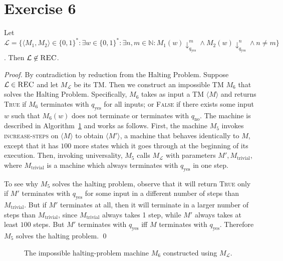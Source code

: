 \documentclass[11pt]{llncs}
\begin{document}
\section*{Exercise 6}
\begin{lemma}
Let $\mathcal{L} = \{
  \langle M_1, M_2 \rangle \in \{0, 1\}^*:
  \exists w \in \{0, 1\}^*: \exists n, m \in \mathbb{N}:
  M_1(w)\downarrow^m_{q_\text{yes}} \land
  M_2(w)\downarrow^n_{q_\text{yes}} \land
  n \neq m
\}$. Then $\mathcal{L} \not \in \textsc{REC}$.
\end{lemma}
\begin{proof}
By contradiction by reduction from the Halting Problem. Suppose
$\mathcal{L} \in \textsc{REC}$ and let $M_\mathcal{L}$ be its TM. Then we
construct an impossible TM $M_6$ that solves the Halting Problem. Specifically,
$M_6$ takes as input a TM $\langle M \rangle$ and returns \textsc{True} if $M_6$
terminates with $q_\text{yes}$ for all inputs; or \textsc{False} if there exists
some input $w$ such that $M_6(w)$ does not terminate or terminates with
$q_\text{no}$. The machine is described in Algorithm~\ref{alg.ex6} and works as
follows. First, the machine $M_5$ invokes \textsc{increase-steps} on
$\langle M \rangle$ to obtain $\langle M' \rangle$, a machine that behaves
identically to $M$, except that it has $100$ more states which it goes through
at the beginning of its execution. Then, invoking universality, $M_5$ calls
$M_\mathcal{L}$ with parameters $M', M_\text{trivial}$, where $M_\text{trivial}$
is a machine which always terminates with $q_\text{yes}$ in one step.

To see why $M_5$ solves the halting problem, observe that it will return
\textsc{True} only if $M'$ terminates with $q_\text{yes}$ for some input in a
different number of steps than $M_\text{trivial}$. But if $M'$ terminates at
all, then it will terminate in a larger number of steps than $M_\text{trivial}$,
since $M_\text{trivial}$ always takes 1 step, while $M'$ always takes at least
$100$ steps. But $M'$ terminates with $q_\text{yes}$ iff $M$ terminates
with $q_\text{yes}$. Therefore $M_5$ solves the halting problem.
\qed
\end{proof}

\begin{figure}[t]
\begin{algorithm}[H]
  \caption{\label{alg.ex6}
      The impossible halting-problem machine $M_6$
      constructed using $M_\mathcal{L}$.
  }
  \begin{algorithmic}[1]
          \State{}
        \EndIf
        \State{}
      \EndFunction
  \end{algorithmic}
\end{algorithm}
\end{figure}
\end{document}

